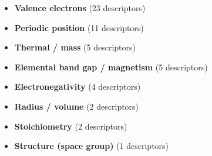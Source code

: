 \begin{itemize}
  \item \textbf{Valence electrons} (23 descriptors)
  \item \textbf{Periodic position} (11 descriptors)
  \item \textbf{Thermal / mass} (5 descriptors)
  \item \textbf{Elemental band gap / magnetism} (5 descriptors)
  \item \textbf{Electronegativity} (4 descriptors)
  \item \textbf{Radius / volume} (2 descriptors)
  \item \textbf{Stoichiometry} (2 descriptors)
  \item \textbf{Structure (space group)} (1 descriptors)
\end{itemize}
